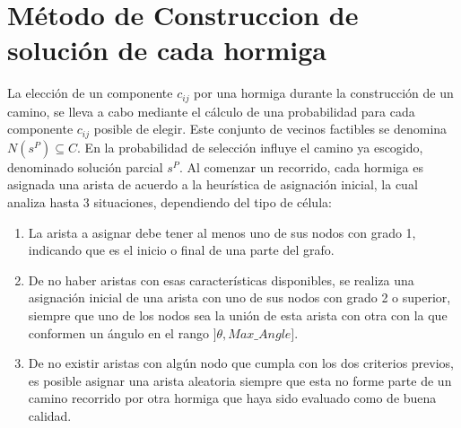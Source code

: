 \section{M\'etodo de Construccion de soluci\'on de cada hormiga}
\label{subsubsec:antTourInit}
La elecci\'on de un componente $c_{ij}$ por una hormiga durante la construcci\'on de un camino, se lleva a cabo mediante el c\'alculo de una probabilidad para cada componente $c_{ij}$ posible de elegir. Este conjunto de vecinos factibles se denomina $N(s^{P}) \subseteq C$. En la probabilidad de selecci\'on influye el camino ya escogido, denominado soluci\'on parcial $s^{P}$. Al comenzar un recorrido, cada hormiga es asignada una arista de acuerdo a la heur\'istica de asignaci\'on inicial, la cual analiza hasta 3 situaciones, dependiendo del tipo de c\'elula:
\begin{enumerate}
\item La arista a asignar debe tener al menos uno de sus nodos con grado 1, indicando que es el inicio o final de una parte del grafo.

\item De no haber aristas con esas caracter\'isticas disponibles, se realiza una asignaci\'on inicial de una arista con uno de sus nodos con grado 2 o superior, siempre que uno de los nodos sea la uni\'on de esta arista con otra con la que conformen un \'angulo en el rango $]\theta, Max\_Angle]$. 

\item De no existir aristas con alg\'un nodo que cumpla con los dos criterios previos, es posible asignar una arista aleatoria siempre que esta no forme parte de un camino recorrido por otra hormiga que haya sido evaluado como de buena calidad.
\end{enumerate}


